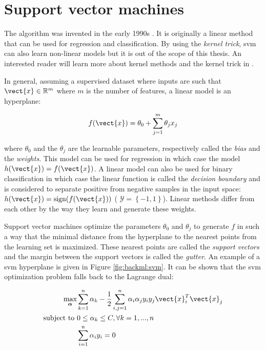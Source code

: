 \section{Support vector machines}
\label{sec:backml:svm}

The  algorithm was invented in the early 1990s \parencite{boser1992training}.
It is originally a linear method that can be used for regression and classification.
By using the \textit{kernel trick}, \acrshort{svm} can also learn non-linear models
but it is out of the scope of this thesis. An interested reader will learn more
about kernel methods and the kernel trick in \parencite{friedman2017elements}.

In general, assuming a supervised dataset where inputs are such that
$\vect{x} \in \mathbb{R}^m$ where $m$ is the number of features, a linear model
is an hyperplane:

\begin{equation}
\label{eqn:backml:linearmodel}
f(\vect{x}) = \theta_0 + \sum_{j=1}^m \theta_j x_j
\end{equation}

where $\theta_0$ and the $\theta_j$ are the learnable parameters, respectively
called the \textit{bias} and the \textit{weights}. This model can be used for
regression in which case the model $h(\vect{x}) = f(\vect{x})$. A linear model
can also be used for binary classification in which case the linear function is
called the \textit{decision boundary} and is considered to separate positive from
negative samples in the input space: $h(\vect{x}) = \text{sign}(f(\vect{x}))$ (\ie
$\mathcal{Y} = \left\{-1, 1\right\}$). Linear methods differ from each other by
the way they learn and generate these weights.

Support vector machines optimize the parameters $\theta_0$ and $\theta_j$ to
generate $f$ in such a way that the minimal distance from the hyperplane to the
nearest points from the learning set is maximized. These nearest points are called
the \textit{support vectors} and the margin between the support vectors is called
the \textit{gutter}. An example of a \acrshort{svm} hyperplane is given in Figure
\ref{fig:backml:svm}. It can be shown that the \acrshort{svm} optimization problem
falls back to the Lagrange dual:

\begin{align}
\label{eqn:backml:svmoptimizationproblem}
\underset{\boldsymbol{\alpha}}{\text{max}}& \sum_{k=1}^n \alpha_k - \frac{1}{2} \sum_{i,j=1}^n \alpha_i\alpha_j y_i y_j \vect{x}_i^T \vect{x}_j \\
\text{subject to}~& 0 \leq \alpha_k \leq C, \forall k = 1, ..., n \\
& \sum_{i=1}^n \alpha_i y_i = 0
\end{align}

